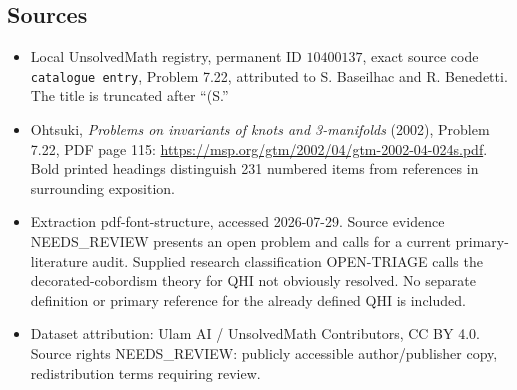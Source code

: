 \documentclass[11pt]{article}
\begin{document}
\subsection{Sources}
\begin{itemize}
\item Local UnsolvedMath registry, permanent ID \(10400137\), exact source code \texttt{catalogue entry}, Problem 7.22, attributed to S. Baseilhac and R. Benedetti. The title is truncated after ``(S.''
\item Ohtsuki, \emph{Problems on invariants of knots and 3-manifolds} (2002), Problem 7.22, PDF page 115: \url{https://msp.org/gtm/2002/04/gtm-2002-04-024s.pdf}. Bold printed headings distinguish 231 numbered items from references in surrounding exposition.
\item Extraction pdf-font-structure, accessed 2026-07-29. Source evidence NEEDS\_REVIEW presents an open problem and calls for a current primary-literature audit. Supplied research classification OPEN-TRIAGE calls the decorated-cobordism theory for QHI not obviously resolved. No separate definition or primary reference for the already defined QHI is included.
\item Dataset attribution: Ulam AI / UnsolvedMath Contributors, CC BY 4.0. Source rights NEEDS\_REVIEW: publicly accessible author/publisher copy, redistribution terms requiring review.
\end{itemize}
\end{document}
